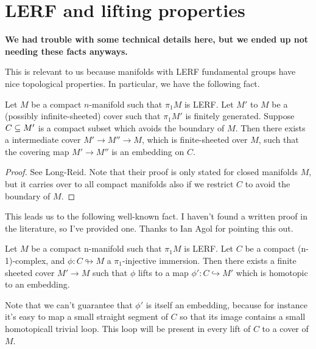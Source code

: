 {%
\section{LERF and lifting properties}
\textbf{We had trouble with some technical details here, but we ended up not
needing these facts anyways.}

This is relevant to us because manifolds with LERF fundamental groups have nice
topological properties. In particular, we have the following fact.

\begin{thm}

Let $M$ be a compact $n$-manifold such that $\pi_1M$ is LERF. Let $M'$ to $M$
be a (possibly infinite-sheeted) cover such that $\pi_1M'$ is finitely
generated.  Suppose $C \subseteq M'$ is a compact subset which avoids the boundary
of $M$. Then there exists a intermediate cover $M' \to M'' \to M$, which is
finite-sheeted over $M$, such that the covering map $M' \to M''$ is an
embedding on $C$.

\end{thm}

\begin{proof}

See Long-Reid. Note that their proof is only stated for closed manifolds $M$,
but it carries over to all compact manifolds also if we restrict $C$ to avoid
the boundary of $M$.


\end{proof}

This leads us to the following well-known fact. I haven't found a written proof
in the literature, so I've provided one. Thanks to Ian Agol for pointing this
out.

\begin{thm}

Let $M$ be a compact n-manifold such that $\pi_1M$ is LERF. Let $C$ be
a compact (n-1)-complex, and $\phi \colon C \looparrowright M$
a $\pi_1$-injective immersion.  Then there exists a finite sheeted cover $M'
\to M$ such that $\phi$ lifts to a map $\phi' \colon C \hookrightarrow M'$
which is homotopic to an embedding.

\end{thm}

Note that we can't guarantee that $\phi'$ is itself an embedding, because for
instance it's easy to map a small straight segment of $C$ so that its image
contains a small homotopicall trivial loop. This loop will be present in every
lift of $C$ to a cover of $M$.

}
